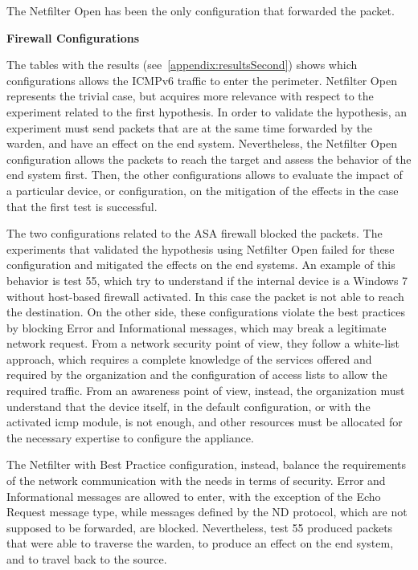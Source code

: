 \documentclass[12pt]{article}
\begin{document}
The Netfilter Open has been the only configuration that forwarded the packet.

\textbf{Firewall Configurations}

The tables with the results (see~\ref{appendix:resultsSecond}) shows which configurations allows the ICMPv6 traffic to enter the perimeter. Netfilter Open represents the trivial case, but acquires more relevance with respect to the experiment related to the first hypothesis. In order to validate the hypothesis, an experiment must send packets that are at the same time forwarded by the warden, and have an effect on the end system. Nevertheless, the Netfilter Open configuration allows the packets to reach the target and assess the behavior of the end system first. Then, the other configurations allows to evaluate the impact of a particular device, or configuration, on the mitigation of the effects in the case that the first test is successful.

The two configurations related to the ASA firewall blocked the packets. The experiments that validated the hypothesis using Netfilter Open failed for these configuration and mitigated the effects on the end systems. An example of this behavior is test 55, which try to understand if the internal device is a Windows 7 without host-based firewall activated. In this case the packet is not able to reach the destination. On the other side, these configurations violate the best practices by blocking Error and Informational messages, which may break a legitimate network request. From a network security point of view, they follow a white-list approach, which requires a complete knowledge of the services offered and required by the organization and the configuration of access lists to allow the required traffic. From an awareness point of view, instead, the organization must understand that the device itself, in the default configuration, or with the activated icmp module, is not enough, and other resources must be allocated for the necessary expertise to configure the appliance.

The Netfilter with Best Practice configuration, instead, balance the requirements of the network communication with the needs in terms of security. Error and Informational messages are allowed to enter, with the exception of the Echo Request message type, while messages defined by the ND protocol, which are not supposed to be forwarded, are blocked. Nevertheless, test 55 produced packets that were able to traverse the warden, to produce an effect on the end system, and to travel back to the source.
\end{document}
